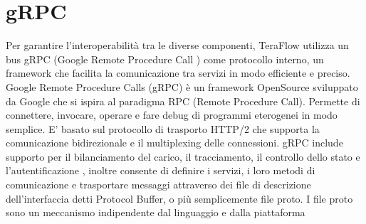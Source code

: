 
\section{gRPC} \label{grpc}
Per garantire l'interoperabilità tra le diverse componenti, TeraFlow utilizza un bus gRPC (Google Remote Procedure Call \cite{grpc}) come protocollo interno, 
un framework che facilita la comunicazione tra servizi in modo efficiente e preciso. 
\newline Google Remote Procedure Calls (gRPC\cite{grpc}) è un framework OpenSource sviluppato da Google che si ispira al paradigma RPC (Remote Procedure Call). Permette di
connettere, invocare, operare e fare debug di programmi eterogenei in modo semplice.
\newline E' basato sul protocollo di trasporto HTTP/2 che supporta la comunicazione bidirezionale e il multiplexing delle connessioni.
\newline gRPC include supporto per il bilanciamento del carico, il tracciamento, il controllo dello stato e l'autentificazione\cite{grpcArt3} \cite{grpcArt1}, inoltre
consente di definire i servizi, i loro metodi di comunicazione e trasportare messaggi attraverso dei file di descrizione dell'interfaccia detti Protocol Buffer, o più semplicemente file proto.
\newline I file proto sono un meccanismo indipendente dal linguaggio e dalla piattaforma 
